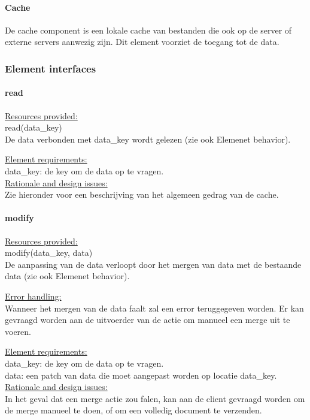 \documentclass[a4paper,10pt]{article}
\begin{document}
\paragraph{Cache}
De cache component is een lokale cache van bestanden die ook op de server of externe servers aanwezig zijn.  Dit element voorziet de toegang tot de data.

\subsubsection{Element interfaces} 

\paragraph{read}

\underline{Resources provided:}\\
read(data\_key)\\
De data verbonden met data\_key wordt gelezen (zie ook Elemenet behavior).

\underline{Element requirements:}\\
data\_key: de key om de data op te vragen.\\

\underline{Rationale and design issues:}\\
Zie hieronder voor een beschrijving van het algemeen gedrag van de cache.

\paragraph{modify}
\underline{Resources provided:}\\
modify(data\_key, data)\\
De aanpassing van de data verloopt door het mergen van data met de bestaande data (zie ook Elemenet behavior).

\underline{Error handling:}\\
Wanneer het mergen van de data faalt zal een error teruggegeven worden.  Er kan gevraagd worden aan de uitvoerder van de actie om manueel een merge uit te voeren.

\underline{Element requirements:}\\
data\_key: de key om de data op te vragen.\\
data: een patch van data die moet aangepast worden op locatie data\_key.\\ 

\underline{Rationale and design issues:}\\
In het geval dat een merge actie zou falen, kan aan de client gevraagd worden om de merge manueel te doen, of om een volledig document te verzenden.
\end{document}
